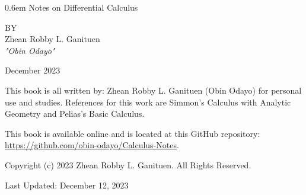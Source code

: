 \documentclass{report}
\newcommand\nbvspace[1][3]{\vspace*{\stretch{#1}}}
\newcommand{\nbtitlestretch}{\spaceskip0.6em}
\begin{document}
{\begin{center}    
    \thispagestyle{empty}
    \Huge
    {\nbtitlestretch\huge
    Notes on Differential Calculus}

    \nbvspace[1]
    \normalsize

    \nbvspace[1]
    \small BY\\
    \Large Zhean Robby L. Ganituen\\[0.5em]
    \tiny\emph{"Obin Odayo"}

    \nbvspace[2]
    \normalsize

    December
    2023
\end{center}}

\newpage

This book is all written by: Zhean Robby L. Ganituen (Obin Odayo) for personal use and studies. References for this work are Simmon's Calculus with Analytic Geometry and Pelias's Basic Calculus.

\bigskip

This book is available online and is located at this GitHub repository: \url{https://github.com/obin-odayo/Calculus-Notes}. 

\bigskip

Copyright (c) 2023 Zhean Robby L. Ganituen. All Rights Reserved.

\bigskip

Last Updated: December 12, 2023

\tableofcontents


\end{document}
